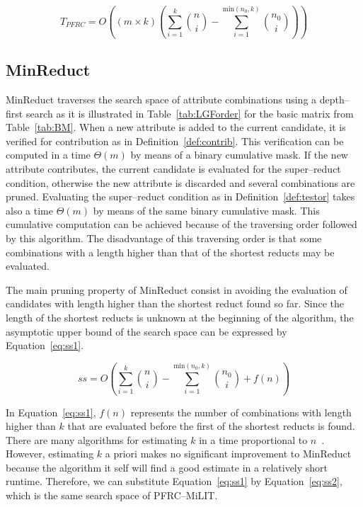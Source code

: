 \documentclass[citenumber]{llncs}
\begin{document}
	\begin{equation}
	T_{PFRC} = O\left((m\times k)\left(\sum_{i=1}^{k} \binom{n}{i} - \sum_{i=1}^{\mathrm{min}(n_0,k)} \binom{n_0}{i}\right)\right)\label{eq:complexPFRC}
	\end{equation}

%	
\subsection{MinReduct}	
%		
	 MinReduct traverses the search space of attribute combinations using a depth--first search as it is illustrated in Table~\ref{tab:LGForder} for the basic matrix from Table~\ref{tab:BM}. When a new attribute is added to the current candidate, it is verified for contribution as in Definition~\ref{def:contrib}. This verification can be computed in a time $\Theta(m)$ by means of a binary cumulative mask. If the new attribute contributes, the current candidate is evaluated for the super--reduct condition, otherwise the new attribute is discarded and several combinations are pruned. Evaluating the super--reduct condition as in Definition~\ref{def:testor} takes also a time $\Theta(m)$  by means of the same binary cumulative mask. This cumulative computation can be achieved because of the traversing order followed by this algorithm. The disadvantage of this traversing order is that some combinations with a length higher than that of the shortest reducts may be evaluated.
	 
	 The main pruning property of MinReduct consist in avoiding the evaluation of candidates with length higher than the shortest reduct found so far. Since the length of the shortest reducts is unknown at the beginning of the algorithm, the asymptotic upper bound of the search space can be expressed by Equation~\ref{eq:ss1}. 
	
	\begin{equation}
		ss = O\left(\sum_{i=1}^{k} \binom{n}{i} - \sum_{i=1}^{\mathrm{min}(n_0,k)} \binom{n_0}{i}+f(n)\right)\label{eq:ss1}
	\end{equation}
	
	In Equation~\ref{eq:ss1}, $f(n)$ represents the number of combinations with length higher than $k$ that are evaluated before the first of the shortest reducts is found. There are many algorithms for estimating $k$ in a time proportional to $n$~\cite{Lin04}. However, estimating $k$ a priori makes no significant improvement to MinReduct because the algorithm it self will find a good estimate in a relatively short runtime. Therefore, we can substitute Equation~\ref{eq:ss1} by Equation~\ref{eq:ss2}, which is the same search space of  PFRC--MiLIT. 
	
\end{document}
